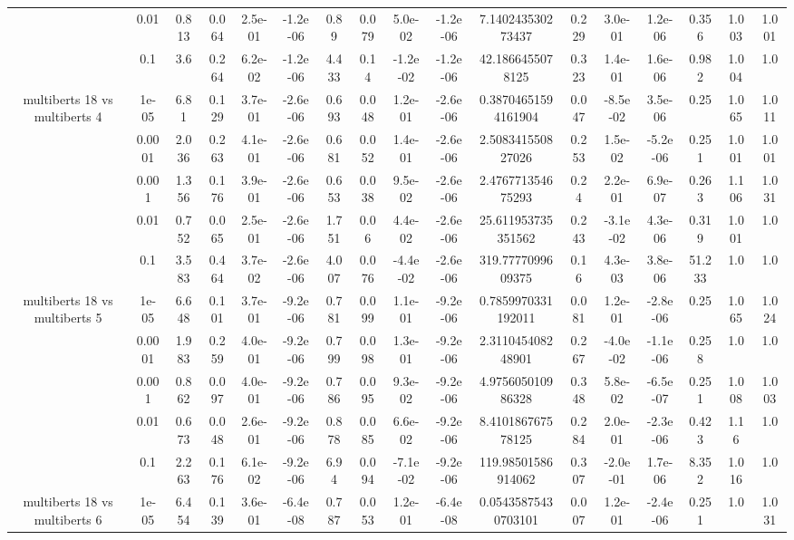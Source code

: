\begin{tabular}{|c|c|c|c|c|c|c|c|c|c|c|c|c|c|c|c|c|}
 & 0.01 & 0.813 & 0.064 & 2.5e-01 & -1.2e-06 & 0.89 & 0.079 & 5.0e-02 & -1.2e-06 & 7.140243530273437 & 0.229 & 3.0e-01 & 1.2e-06 & 0.356 & 1.003 & 1.001 \\
 & 0.1 & 3.6 & 0.264 & 6.2e-02 & -1.2e-06 & 4.433 & 0.14 & -1.2e-02 & -1.2e-06 & 42.1866455078125 & 0.323 & 1.4e-01 & 1.6e-06 & 0.982 & 1.004 & 1.0 \\
\hline
\multirow{5}{*}{multiberts 18 vs multiberts 4} & 1e-05 & 6.81 & 0.129 & 3.7e-01 & -2.6e-06 & 0.693 & 0.048 & 1.2e-01 & -2.6e-06 & 0.38704651594161904 & 0.047 & -8.5e-02 & 3.5e-06 & 0.25 & 1.065 & 1.011 \\
 & 0.0001 & 2.036 & 0.263 & 4.1e-01 & -2.6e-06 & 0.681 & 0.052 & 1.4e-01 & -2.6e-06 & 2.508341550827026 & 0.253 & 1.5e-02 & -5.2e-06 & 0.251 & 1.001 & 1.001 \\
 & 0.001 & 1.356 & 0.176 & 3.9e-01 & -2.6e-06 & 0.653 & 0.038 & 9.5e-02 & -2.6e-06 & 2.476771354675293 & 0.24 & 2.2e-01 & 6.9e-07 & 0.263 & 1.106 & 1.031 \\
 & 0.01 & 0.752 & 0.065 & 2.5e-01 & -2.6e-06 & 1.751 & 0.06 & 4.4e-02 & -2.6e-06 & 25.611953735351562 & 0.243 & -3.1e-02 & 4.3e-06 & 0.319 & 1.001 & 1.0 \\
 & 0.1 & 3.583 & 0.464 & 3.7e-02 & -2.6e-06 & 4.007 & 0.076 & -4.4e-02 & -2.6e-06 & 319.7777099609375 & 0.16 & 4.3e-03 & 3.8e-06 & 51.233 & 1.0 & 1.0 \\
\hline
\multirow{5}{*}{multiberts 18 vs multiberts 5} & 1e-05 & 6.648 & 0.101 & 3.7e-01 & -9.2e-06 & 0.781 & 0.099 & 1.1e-01 & -9.2e-06 & 0.7859970331192011 & 0.081 & 1.2e-01 & -2.8e-06 & 0.25 & 1.065 & 1.024 \\
 & 0.0001 & 1.983 & 0.259 & 4.0e-01 & -9.2e-06 & 0.799 & 0.098 & 1.3e-01 & -9.2e-06 & 2.311045408248901 & 0.267 & -4.0e-02 & -1.1e-06 & 0.258 & 1.0 & 1.0 \\
 & 0.001 & 0.862 & 0.097 & 4.0e-01 & -9.2e-06 & 0.786 & 0.095 & 9.3e-02 & -9.2e-06 & 4.975605010986328 & 0.348 & 5.8e-02 & -6.5e-07 & 0.251 & 1.008 & 1.003 \\
 & 0.01 & 0.673 & 0.048 & 2.6e-01 & -9.2e-06 & 0.878 & 0.085 & 6.6e-02 & -9.2e-06 & 8.410186767578125 & 0.284 & 2.0e-01 & -2.3e-06 & 0.423 & 1.16 & 1.0 \\
 & 0.1 & 2.263 & 0.176 & 6.1e-02 & -9.2e-06 & 6.94 & 0.094 & -7.1e-02 & -9.2e-06 & 119.98501586914062 & 0.307 & -2.0e-01 & 1.7e-06 & 8.352 & 1.016 & 1.0 \\
\hline
\multirow{5}{*}{multiberts 18 vs multiberts 6} & 1e-05 & 6.454 & 0.139 & 3.6e-01 & -6.4e-08 & 0.787 & 0.053 & 1.2e-01 & -6.4e-08 & 0.05435875430703101 & 0.007 & 1.2e-01 & -2.4e-06 & 0.251 & 1.0 & 1.031 \\

\end{tabular}
